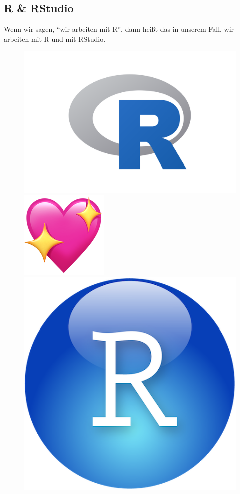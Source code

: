 \documentclass[
  letterpaper,
  oneside,
  open=any]{scrbook}
\theoremstyle{definition}
\theoremstyle{definition}
\theoremstyle{definition}
\theoremstyle{remark}
\begin{document}
\subsection{R \& RStudio}\label{r-rstudio}

Wenn wir sagen, \enquote{wir arbeiten mit R}, dann heißt das in unserem
Fall, wir arbeiten mit R und mit RStudio.

\begin{figure}

\begin{minipage}{0.40\linewidth}

\includegraphics[width=0.7\linewidth,height=\textheight,keepaspectratio]{img/rlogo.png}

\end{minipage}%
%
\begin{minipage}{0.20\linewidth}

\includegraphics[width=0.4\linewidth,height=\textheight,keepaspectratio]{img/sparkling_heart.png}

\end{minipage}%
%
\begin{minipage}{0.40\linewidth}

\includegraphics[width=0.4\linewidth,height=\textheight,keepaspectratio]{img/rstudio-logo-small.png}


\end{minipage}
\end{figure}
\end{document}
